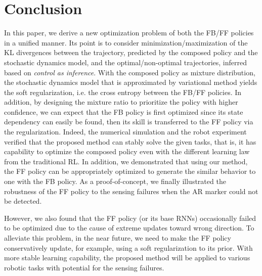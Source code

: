 \documentclass{bmcart}
\begin{document}
\section{Conclusion}
\label{sec:conclusion}

In this paper, we derive a new optimization problem of both the FB/FF policies in a unified manner.
Its point is to consider minimization/maximization of the KL divergences between the trajectory, predicted by the composed policy and the stochastic dynamics model, and the optimal/non-optimal trajectories, inferred based on \textit{control as inference}.
With the composed policy as mixture distribution, the stochastic dynamics model that is approximated by variational method yields the soft regularization, i.e. the cross entropy between the FB/FF policies.
In addition, by designing the mixture ratio to prioritize the policy with higher confidence, we can expect that the FB policy is first optimized since its state dependency can easily be found, then its skill is transferred to the FF policy via the regularization.
Indeed, the numerical simulation and the robot experiment verified that the proposed method can stably solve the given tasks, that is, it has capability to optimize the composed policy even with the different learning law from the traditional RL.
In addition, we demonstrated that using our method, the FF policy can be appropriately optimized to generate the similar behavior to one with the FB policy.
As a proof-of-concept, we finally illustrated the robustness of the FF policy to the sensing failures when the AR marker could not be detected.

However, we also found that the FF policy (or its base RNNs) occasionally failed to be optimized due to the cause of extreme updates toward wrong direction.
To alleviate this problem, in the near future, we need to make the FF policy conservatively update, for example, using a soft regularization to its prior.
With more stable learning capability, the proposed method will be applied to various robotic tasks with potential for the sensing failures.

\end{document}

